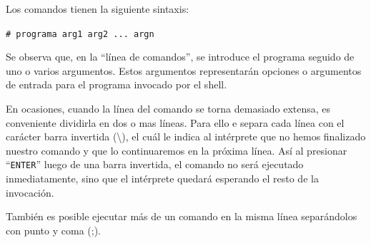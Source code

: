 \documentclass[12pt]{article}
\begin{document}
Los comandos tienen la siguiente sintaxis:

\texttt{\# programa arg1 arg2 ... argn}

Se observa que, en la ``línea de comandos'', se introduce el programa seguido de uno o varios argumentos. 
Estos argumentos representarán opciones o argumentos de entrada para el programa invocado por el shell. 


En ocasiones, cuando la línea del comando se torna demasiado extensa, es conveniente dividirla
en dos o mas líneas. Para ello e separa cada línea con el carácter barra invertida (\textbackslash), 
el cuál le indica al intérprete que no hemos finalizado nuestro comando y que lo continuaremos 
en la próxima línea. Así al presionar ``\texttt{ENTER}'' luego de una barra invertida, el comando 
no será ejecutado inmediatamente, sino que el intérprete quedará esperando el resto de la invocación. 

También es posible ejecutar más de un comando en la misma línea separándolos con punto y coma (;). 

\end{document}
